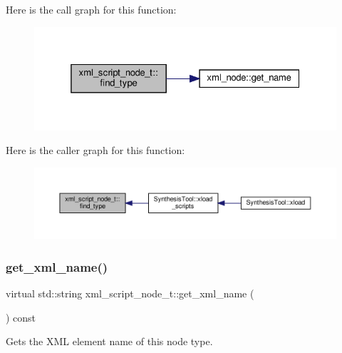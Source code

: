 Here is the call graph for this function\+:
\nopagebreak
\begin{figure}[H]
\begin{center}
\leavevmode
\includegraphics[width=325pt]{d6/de5/classxml__script__node__t_aca8e03906a47471b458570a203829aa3_cgraph}
\end{center}
\end{figure}
Here is the caller graph for this function\+:
\nopagebreak
\begin{figure}[H]
\begin{center}
\leavevmode
\includegraphics[width=350pt]{d6/de5/classxml__script__node__t_aca8e03906a47471b458570a203829aa3_icgraph}
\end{center}
\end{figure}
\mbox{\label{classxml__script__node__t_af5815fab8924e5e4f47ba1b7266b6cb8}} 
\subsubsection{\texorpdfstring{get\+\_\+xml\+\_\+name()}{get\_xml\_name()}}
{\footnotesize\ttfamily virtual std\+::string xml\+\_\+script\+\_\+node\+\_\+t\+::get\+\_\+xml\+\_\+name (\begin{DoxyParamCaption}{ }\end{DoxyParamCaption}) const\hspace{0.3cm}{\ttfamily [pure virtual]}}



Gets the X\+ML element name of this node type. 



